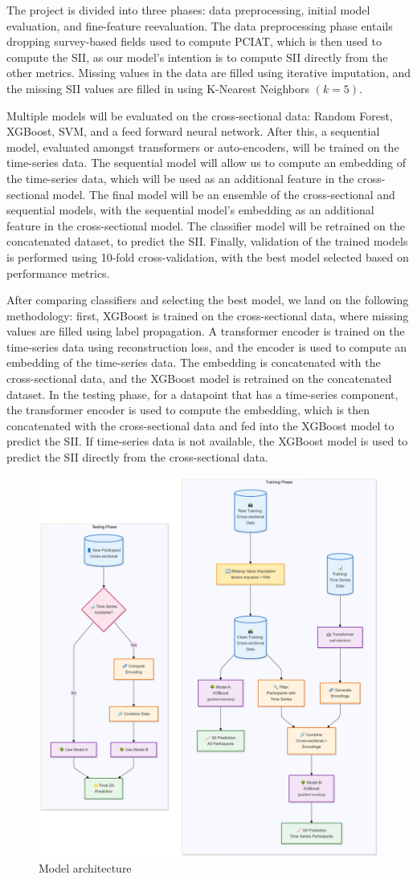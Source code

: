 \documentclass[12pt]{extarticle}
\begin{document}
  The project is divided into three phases: data preprocessing, initial model evaluation, and fine-feature reevaluation.
  The data preprocessing phase entails dropping survey-based fields used to compute PCIAT, which is then used to compute the SII, as our model's intention is to compute SII directly from the other metrics.
  Missing values in the data are filled using iterative imputation, and the missing SII values are filled in using K-Nearest Neighbors $(k=5)$.

  Multiple models will be evaluated on the cross-sectional data: Random Forest, XGBoost, SVM, and a feed forward neural network. After this, a sequential model, evaluated amongst transformers or auto-encoders, will be trained on the time-series data. 
  The sequential model will allow us to compute an embedding of the time-series data, which will be used as an additional feature in the cross-sectional model.
  The final model will be an ensemble of the cross-sectional and sequential models, with the sequential model's embedding as an additional feature in the cross-sectional model. 
  The classifier model will be retrained on the concatenated dataset, to predict the SII.
  Finally, validation of the trained models is performed using 10-fold cross-validation, with the best model selected based on performance metrics.

  After comparing classifiers and selecting the best model, we land on the following methodology: 
  first, XGBoost is trained on the cross-sectional data, where missing values are filled using label propagation. 
  A transformer encoder is trained on the time-series data using reconstruction loss, and the encoder is used to compute an embedding of the time-series data. 
  The embedding is concatenated with the cross-sectional data, and the XGBoost model is retrained on the concatenated dataset.
  In the testing phase, for a datapoint that has a time-series component, the transformer encoder is used to compute the embedding, which is then concatenated with the cross-sectional data and fed into the XGBoost model to predict the SII. 
  If time-series data is not available, the XGBoost model is used to predict the SII directly from the cross-sectional data.

  \begin{figure}
    \centering
    \includegraphics[width=0.5\linewidth]{images/schematic.png}
    \caption{Model architecture}
    \label{'table:architecture'}
  \end{figure}
\end{document}
